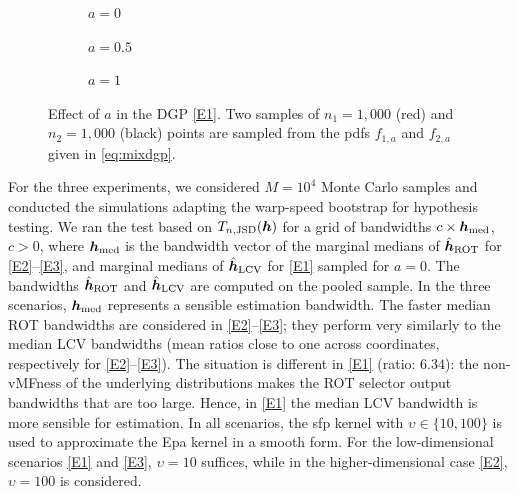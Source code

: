 \documentclass[oneside,11pt]{article}
\begin{document}
\begin{figure}
    \centering
    \begin{subfigure}{0.33\textwidth}
        \centering
        \caption{\small $a=0$} \label{fig:mixdgp:a}
    \end{subfigure}%
    \begin{subfigure}{0.33\textwidth}
        \centering
        \caption{\small $a=0.5$} \label{fig:mixdgp:b}
    \end{subfigure}%
    \begin{subfigure}{0.33\textwidth}
        \centering
        \caption{\small $a=1$} \label{fig:mixdgp:c}
    \end{subfigure}%
    \caption{\small Effect of $a$ in the DGP \ref{E1}. Two samples of $n_1=1,\!000$ (red) and $n_2=1,\!000$ (black) points are sampled from the pdfs $f_{1,a}$ and $f_{2,a}$ given in \eqref{eq:mixdgp}.}
    \label{fig:mixdgp}
\end{figure}

For the three experiments, we considered $M=10^4$ Monte Carlo samples and conducted the simulations adapting the warp-speed bootstrap \citep{Giacomini2013} for hypothesis testing. We ran the test based on $T_{n,\mathrm{JSD}}({\boldsymbol{h}})$ for a grid of bandwidths $c\times {\boldsymbol{h}}_\mathrm{med}$, $c>0$, where ${\boldsymbol{h}}_\mathrm{med}$ is the bandwidth vector of the marginal medians of $\hat{{\boldsymbol{h}}}_\mathrm{ROT}$ for \ref{E2}--\ref{E3}, and marginal medians of $\hat{{\boldsymbol{h}}}_\mathrm{LCV}$ for \ref{E1} sampled for $a=0$. The bandwidths $\hat{{\boldsymbol{h}}}_\mathrm{ROT}$ and $\hat{{\boldsymbol{h}}}_\mathrm{LCV}$ are computed on the pooled sample. In the three scenarios, ${\boldsymbol{h}}_\mathrm{med}$ represents a sensible estimation bandwidth. The faster median ROT bandwidths are considered in \ref{E2}--\ref{E3}; they perform very similarly to the median LCV bandwidths (mean ratios close to one %
across coordinates, respectively for \ref{E2}--\ref{E3}). The situation is different in \ref{E1} (ratio: $6.34$): the non-vMFness of the underlying distributions makes the ROT selector output bandwidths that are too large. Hence, in \ref{E1} the median LCV bandwidth is more sensible for estimation. In all scenarios, the sfp kernel with $\upsilon\in\{10,100\}$ is used to approximate the Epa kernel in a smooth form. For the low-dimensional scenarios \ref{E1} and \ref{E3}, $\upsilon=10$ suffices, while in the higher-dimensional case \ref{E2}, $\upsilon=100$ is considered.
\end{document}
